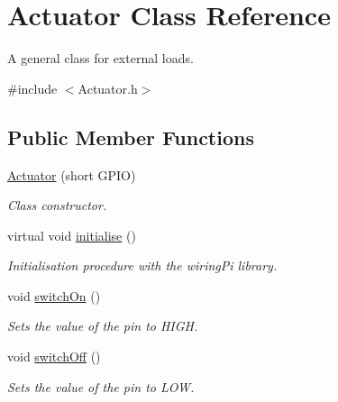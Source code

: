 \hypertarget{classActuator}{}\section{Actuator Class Reference}
\label{classActuator}


A general class for external loads.  




{\ttfamily \#include $<$Actuator.\+h$>$}

\subsection*{Public Member Functions}
\begin{DoxyCompactItemize}
\item 
\mbox{\hyperlink{classActuator_a8323c15d7ca85370d2760cbcaba7cb07}{Actuator}} (short G\+P\+IO)
\begin{DoxyCompactList}\small\item\em Class constructor. \end{DoxyCompactList}\item 
\mbox{\label{classActuator_a5537adf881ed487909d9c08c5d6aa11c}} 
virtual void \mbox{\hyperlink{classActuator_a5537adf881ed487909d9c08c5d6aa11c}{initialise}} ()
\begin{DoxyCompactList}\small\item\em Initialisation procedure with the wiring\+Pi library. \end{DoxyCompactList}\item 
\mbox{\label{classActuator_ad601cfe00148629da1c4dbbee51bbc8c}} 
void \mbox{\hyperlink{classActuator_ad601cfe00148629da1c4dbbee51bbc8c}{switch\+On}} ()
\begin{DoxyCompactList}\small\item\em Sets the value of the pin to H\+I\+GH. \end{DoxyCompactList}\item 
\mbox{\label{classActuator_a4ba3e5924188bb4f9f81a5adebb70be5}} 
void \mbox{\hyperlink{classActuator_a4ba3e5924188bb4f9f81a5adebb70be5}{switch\+Off}} ()
\begin{DoxyCompactList}\small\item\em Sets the value of the pin to L\+OW. \end{DoxyCompactList}\end{DoxyCompactItemize}


